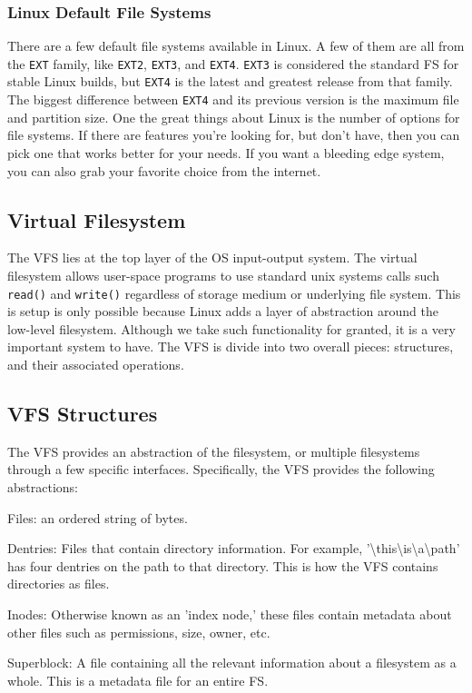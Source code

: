 \documentclass[10pt,letterpaper,onecolumn,draftclsnofoot]{IEEEtran}
\begin{document}
  \subsubsection{Linux Default File Systems}
  There are a few default file systems available in Linux. A few of them are
  all from the \texttt{EXT} family, like \texttt{EXT2}, \texttt{EXT3}, and
  \texttt{EXT4}. \texttt{EXT3} is considered the standard FS for stable Linux
  builds, but \texttt{EXT4} is the latest and greatest release from that family.
  The biggest difference between \texttt{EXT4} and its previous version is the
  maximum file and partition size.\cite{anthonyjsimon2015}
  One the great things about Linux is the number of options for file systems.
  If there are features you're looking for, but don't have, then you can pick
  one that works better for your needs. If you want a bleeding edge system, you
  can also grab your favorite choice from the internet. 

  \subsection{Virtual Filesystem}
  The VFS lies at the top layer of the OS input-output system. The virtual
  filesystem allows user-space programs to use standard unix systems calls
  such \texttt{read()} and \texttt{write()} regardless of storage medium or
  underlying file system. This is setup is only possible because Linux adds
  a layer of abstraction around the low-level filesystem. Although we take
  such functionality for granted, it is a very important system to have.
  The VFS is divide into two overall pieces: structures, and their associated
  operations. \cite{robertlove2010}

  \subsection{VFS Structures}
  The VFS provides an abstraction of the filesystem, or multiple filesystems
  through a few specific interfaces. Specifically, the VFS provides the
  following abstractions:
  \begin{description}
    \item Files: an ordered string of bytes.
    \item Dentries: Files that contain directory information. For example,
    '\textbackslash this\textbackslash is\textbackslash a\textbackslash path'
    has four dentries on the path to that directory. This is how the VFS contains
    directories as files.
    \item Inodes: Otherwise known as an 'index node,' these files contain metadata
    about other files such as permissions, size, owner, etc.
    \item Superblock: A file containing all the relevant information about a filesystem
    as a whole. This is a metadata file for an entire FS.
  \end{description}
\end{document}
